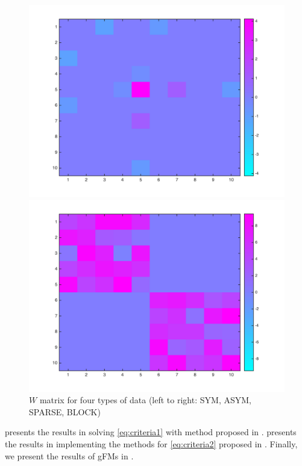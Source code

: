 \documentclass{article}
\begin{document}
\begin{figure}[htbp]
\begin{minipage}{0.24\textwidth}
    \includegraphics[width=1\textwidth]{../yanyu_code/plots/sparse}
  \end{minipage}
  \hfill
  \begin{minipage}{0.24\textwidth}
    \centering
    \includegraphics[width=1\textwidth]{../yanyu_code/plots/block}
  \end{minipage}
  \caption{$W$ matrix for four types of data (left to right: SYM, ASYM, SPARSE, BLOCK)}
  \label{fig:designW}
\end{figure}

 presents the results in solving \cref{eq:criteria1} with method proposed in .  presents the results in implementing the methods for \cref{eq:criteria2} proposed in . Finally, we present the results of gFMs in .
\end{document}
